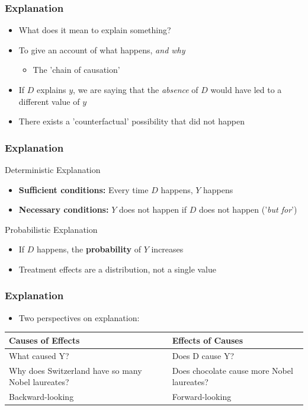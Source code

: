 \documentclass[xcolor=x11names,compress]{beamer}\usepackage[]{graphicx}\usepackage[]{color}
\renewcommand{\(}{\begin{columns}}
\renewcommand{\)}{\end{columns}}
\newcommand{\<}[1]{\begin{column}{#1}}
\renewcommand{\>}{\end{column}}
\begin{document}
\begin{frame}
\frametitle{Explanation}
\begin{itemize}
\item What does it mean to explain something?
\pause
\item To give an account of what happens, \textit{and why}
\begin{itemize}
\item The 'chain of causation'
\pause
\end{itemize}
\item If $D$ explains $y$, we are saying that the \textit{absence} of $D$ would have led to a different value of $y$
\pause
\item There exists a 'counterfactual' possibility that did not happen
\end{itemize}
\end{frame}

\begin{frame}
\frametitle{Explanation}
\begin{multicols}{2}
\textcolor{dkblue}{Deterministic Explanation}
\pause
\begin{itemize}
\item \textbf{Sufficient conditions:} Every time $D$ happens, $Y$ happens
\pause
\item \textbf{Necessary conditions:} $Y$ does not happen if $D$ does not happen ('\textit{but for}')
\end{itemize}
\pause
\columnbreak
\textcolor{dkblue}{Probabilistic Explanation}
\pause
\begin{itemize}
\item If $D$ happens, the \textbf{probability} of $Y$ increases
\pause
\item Treatment effects are a distribution, not a single value
\end{itemize}
\end{multicols}
\end{frame}

\begin{frame}
\frametitle{Explanation}
\begin{itemize}
\item Two perspectives on explanation:
\end{itemize}
\pause
\begin{table}[htbp]
  \centering
    \begin{tabular}{|>{\raggedright}p{5cm}|p{5cm}|}
    \toprule
    \textbf{Causes of Effects} & \textbf{Effects of Causes} \\
    \midrule
    What caused Y? & Does D cause Y? \\
    \midrule
    Why does Switzerland have so many Nobel laureates? & Does chocolate cause more Nobel laureates? \\
    \midrule
    Backward-looking & Forward-looking \\
    \bottomrule
    \end{tabular}%
  \label{tab:addlabel}%
\end{table}%
\end{frame}
\end{document}
